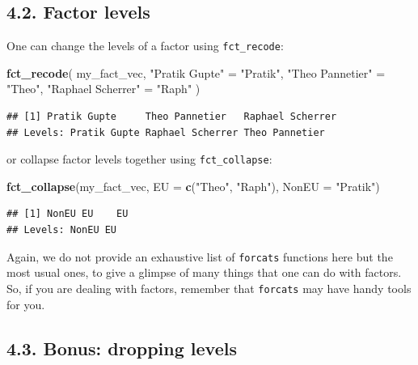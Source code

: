 \documentclass[]{book}
\newenvironment{Shaded}{}{}
\newcommand{\DataTypeTok}[1]{\textcolor[rgb]{0.56,0.13,0.00}{#1}}
\newcommand{\KeywordTok}[1]{\textcolor[rgb]{0.00,0.44,0.13}{\textbf{#1}}}
\newcommand{\NormalTok}[1]{#1}
\newcommand{\StringTok}[1]{\textcolor[rgb]{0.25,0.44,0.63}{#1}}
\begin{document}
\hypertarget{factor-levels}{%
\subsection{4.2. Factor levels}\label{factor-levels}}

One can change the levels of a factor using \texttt{fct\_recode}:

\begin{Shaded}
\begin{Highlighting}[]
\KeywordTok{fct_recode}\NormalTok{(}
\NormalTok{  my_fact_vec, }
  \StringTok{"Pratik Gupte"}\NormalTok{ =}\StringTok{ "Pratik"}\NormalTok{, }
  \StringTok{"Theo Pannetier"}\NormalTok{ =}\StringTok{ "Theo"}\NormalTok{, }
  \StringTok{"Raphael Scherrer"}\NormalTok{ =}\StringTok{ "Raph"}
\NormalTok{)}
\end{Highlighting}
\end{Shaded}

\begin{verbatim}
## [1] Pratik Gupte     Theo Pannetier   Raphael Scherrer
## Levels: Pratik Gupte Raphael Scherrer Theo Pannetier
\end{verbatim}

or collapse factor levels together using \texttt{fct\_collapse}:

\begin{Shaded}
\begin{Highlighting}[]
\KeywordTok{fct_collapse}\NormalTok{(my_fact_vec, }\DataTypeTok{EU =} \KeywordTok{c}\NormalTok{(}\StringTok{"Theo"}\NormalTok{, }\StringTok{"Raph"}\NormalTok{), }\DataTypeTok{NonEU =} \StringTok{"Pratik"}\NormalTok{)}
\end{Highlighting}
\end{Shaded}

\begin{verbatim}
## [1] NonEU EU    EU   
## Levels: NonEU EU
\end{verbatim}

Again, we do not provide an exhaustive list of \texttt{forcats} functions here but the most usual ones, to give a glimpse of many things that one can do with factors. So, if you are dealing with factors, remember that \texttt{forcats} may have handy tools for you.

\hypertarget{bonus-dropping-levels}{%
\subsection{4.3. Bonus: dropping levels}\label{bonus-dropping-levels}}
\end{document}
